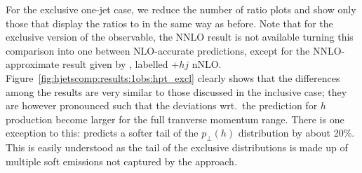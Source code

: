 For the exclusive one-jet case, we reduce the number of ratio plots
and show only those that display the ratios to \Powheg in the same way
as before. Note that for the exclusive version of the observable, the
NNLO result is not available turning this comparison into one between
NLO-accurate predictions, except for the NNLO-approximate result given
by \Loopsim, labelled \GoSam{}+\Sherpa $hj$ nNLO.
Figure~\ref{fig:hjetscomp:results:1obs:hpt_excl} clearly shows that
the differences among the results are very similar to those discussed
in the inclusive case; they are however pronounced such that the
deviations wrt.~the \Powheg \NNLOPS prediction for $h$ production
become larger for the full tranverse momentum range. There is one
exception to this: \Loopsim predicts a softer tail of the $p_\perp(h)$
distribution by about 20\%. This is easily understood as the tail of 
the exclusive distributions is made up of multiple soft emissions not 
captured by the \Loopsim approach.

